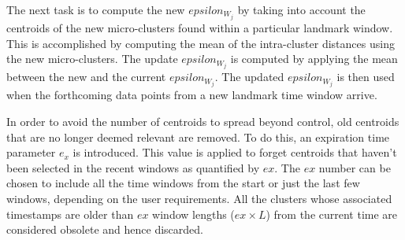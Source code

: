 \begin{itemize}[leftmargin=*]
    The next task is to compute the new $epsilon_{W_j}$ by taking into account the centroids of the new micro-clusters found within a particular landmark window. This is accomplished by computing the mean of the intra-cluster distances using the new micro-clusters. The update $epsilon_{W_j}$ is computed by applying the mean between the new and the current $epsilon_{W_j}$. The updated $epsilon_{W_j}$ is then used when the forthcoming data points from a new landmark time window arrive.
    
    
  
    
    

   In order to avoid the number of centroids to spread beyond control, old centroids that are no longer deemed relevant are removed. To do this, an expiration time parameter $e_x$ is introduced. This value is applied to forget centroids that haven't been selected in the recent windows as quantified by $ex$. The $ex$ number can be chosen to include all the time windows from the start or just the last few windows, depending on the user requirements. All the clusters whose associated timestamps are older than $ex$ window lengths ($ex \times L$) from the current time are considered obsolete and hence discarded. 
   





\end{itemize}
